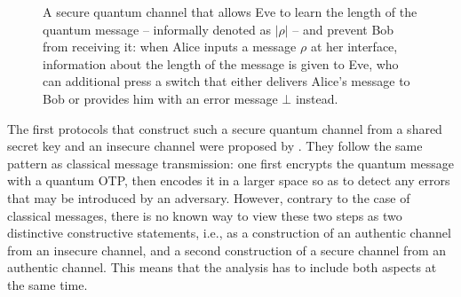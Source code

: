 \begin{figure}[tb]


\caption[Secure quantum channel]{\label{fig:secure.quantum.resource}A
  secure quantum channel that allows Eve to learn the length of the
  quantum message \--- informally denoted as $|\rho|$ \--- and prevent
  Bob from receiving it: when Alice inputs a message $\rho$ at her
  interface, information about the length of the message is given to
  Eve, who can additional press a switch that either delivers Alice's
  message to Bob or provides him with an error message $\bot$
  instead.}
\end{figure}

The first protocols that construct such a secure quantum channel from a shared secret key and an insecure channel were proposed by \textcite{BCGST02}. They follow the same pattern as classical message transmission: one first encrypts the quantum message with a quantum OTP, then encodes it in a larger space so as to detect any errors that may be introduced by an adversary. However, contrary to the case of classical messages, there is no known way to view these two steps as two distinctive constructive statements, i.e., as a construction of an authentic channel from an insecure channel, and a second construction of a secure channel from an authentic channel. This means that the analysis has to include both aspects at the same time.


